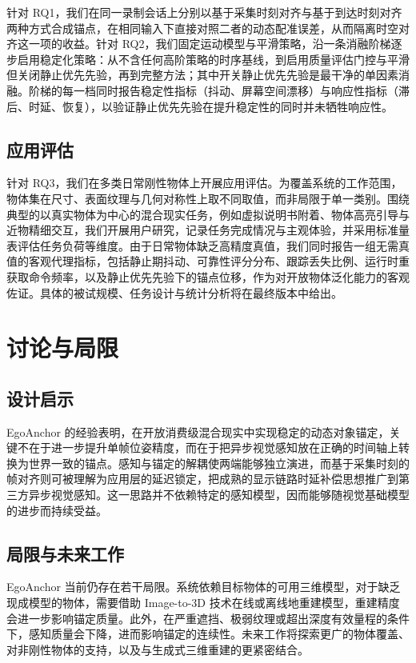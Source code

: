 \documentclass[review]{vgtc}
\begin{document}
针对 RQ1，我们在同一录制会话上分别以基于采集时刻对齐与基于到达时刻对齐两种方式合成锚点，在相同输入下直接对照二者的动态配准误差，从而隔离时空对齐这一项的收益。针对 RQ2，我们固定运动模型与平滑策略，沿一条消融阶梯逐步启用稳定化策略：从不含任何高阶策略的时序基线，到启用质量评估门控与平滑但关闭静止优先先验，再到完整方法；其中开关静止优先先验是最干净的单因素消融。阶梯的每一档同时报告稳定性指标（抖动、屏幕空间漂移）与响应性指标（滞后、时延、恢复），以验证静止优先先验在提升稳定性的同时并未牺牲响应性。

\subsection{应用评估}


针对 RQ3，我们在多类日常刚性物体上开展应用评估。为覆盖系统的工作范围，物体集在尺寸、表面纹理与几何对称性上取不同取值，而非局限于单一类别。围绕典型的以真实物体为中心的混合现实任务，例如虚拟说明书附着、物体高亮引导与近物精细交互，我们开展用户研究，记录任务完成情况与主观体验，并采用标准量表评估任务负荷等维度。由于日常物体缺乏高精度真值，我们同时报告一组无需真值的客观代理指标，包括静止期抖动、可靠性评分分布、跟踪丢失比例、运行时重获取命令频率，以及静止优先先验下的锚点位移，作为对开放物体泛化能力的客观佐证。具体的被试规模、任务设计与统计分析将在最终版本中给出。

\section{讨论与局限}\label{sec:discussion}


\subsection{设计启示}


EgoAnchor 的经验表明，在开放消费级混合现实中实现稳定的动态对象锚定，关键不在于进一步提升单帧位姿精度，而在于把异步视觉感知放在正确的时间轴上转换为世界一致的锚点。感知与锚定的解耦使两端能够独立演进，而基于采集时刻的帧对齐则可被理解为应用层的延迟锁定，把成熟的显示链路时延补偿思想推广到第三方异步视觉感知。这一思路并不依赖特定的感知模型，因而能够随视觉基础模型的进步而持续受益。

\subsection{局限与未来工作}


EgoAnchor 当前仍存在若干局限。系统依赖目标物体的可用三维模型，对于缺乏现成模型的物体，需要借助 Image-to-3D 技术在线或离线地重建模型，重建精度会进一步影响锚定质量。此外，在严重遮挡、极弱纹理或超出深度有效量程的条件下，感知质量会下降，进而影响锚定的连续性。未来工作将探索更广的物体覆盖、对非刚性物体的支持，以及与生成式三维重建的更紧密结合。
\end{document}
